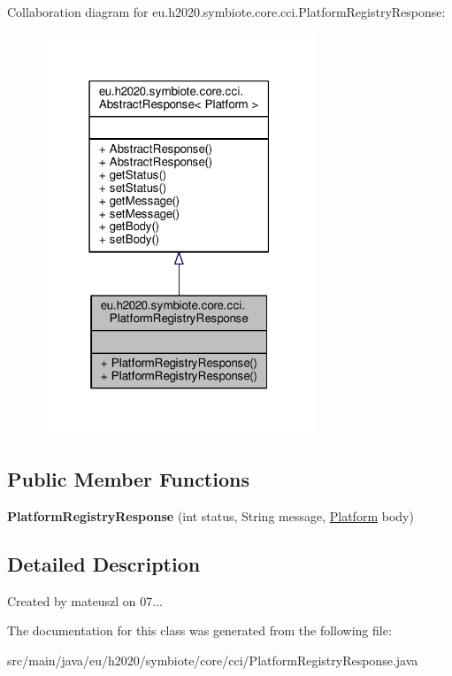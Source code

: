 Collaboration diagram for eu.\+h2020.\+symbiote.\+core.\+cci.\+Platform\+Registry\+Response\+:
\nopagebreak
\begin{figure}[H]
\begin{center}
\leavevmode
\includegraphics[width=232pt]{classeu_1_1h2020_1_1symbiote_1_1core_1_1cci_1_1PlatformRegistryResponse__coll__graph}
\end{center}
\end{figure}
\subsection*{Public Member Functions}
\begin{DoxyCompactItemize}
\item 
\mbox{\label{classeu_1_1h2020_1_1symbiote_1_1core_1_1cci_1_1PlatformRegistryResponse_a624805ede42e5cba5d325fda1b3cc94f}} 
{\bfseries Platform\+Registry\+Response} (int status, String message, \hyperlink{classeu_1_1h2020_1_1symbiote_1_1model_1_1mim_1_1Platform}{Platform} body)
\end{DoxyCompactItemize}


\subsection{Detailed Description}
Created by mateuszl on 07... 

The documentation for this class was generated from the following file\+:\begin{DoxyCompactItemize}
\item 
src/main/java/eu/h2020/symbiote/core/cci/Platform\+Registry\+Response.\+java\end{DoxyCompactItemize}
